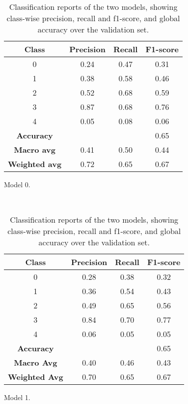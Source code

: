 \begin{table}[htbp]
    \centering
    
    \begin{subtable}{\textwidth}
        \centering
        \begin{tabular}{cccc}
            \toprule
            \textbf{Class} & \textbf{Precision} & \textbf{Recall} & \textbf{F1-score} \\
            \midrule
            0 & 0.24 & 0.47 & 0.31 \\
            1 & 0.38 & 0.58 & 0.46 \\
            2 & 0.52 & 0.68 & 0.59 \\
            3 & 0.87 & 0.68 & 0.76 \\
            4 & 0.05 & 0.08 & 0.06 \\
            \midrule
            \textbf{Accuracy} & & & 0.65 \\
            \textbf{Macro avg} & 0.41 & 0.50 & 0.44 \\
            \textbf{Weighted avg} & 0.72 & 0.65 & 0.67 \\
            \bottomrule
        \end{tabular}
        \caption{Model 0.}
    \end{subtable}
    \vspace{0cm}\\

    \begin{subtable}{\textwidth}
        \centering
        \begin{tabular}{cccc}
            \toprule
            \textbf{Class} & \textbf{Precision} & \textbf{Recall} & \textbf{F1-score} \\
            \midrule
            0 & 0.28 & 0.38 & 0.32 \\
            1 & 0.36 & 0.54 & 0.43 \\
            2 & 0.49 & 0.65 & 0.56 \\
            3 & 0.84 & 0.70 & 0.77 \\
            4 & 0.06 & 0.05 & 0.05 \\
            \midrule
            \textbf{Accuracy} & & & 0.65 \\
            \textbf{Macro Avg} & 0.40 & 0.46 & 0.43 \\
            \textbf{Weighted Avg} & 0.70 & 0.65 & 0.67 \\
            \bottomrule
        \end{tabular}
        \caption{Model 1.}
    \end{subtable}
    
    \caption{Classification reports of the two models, showing class-wise precision, recall and f1-score, and global accuracy over the validation set.}
    \label{tab:report}
\end{table}